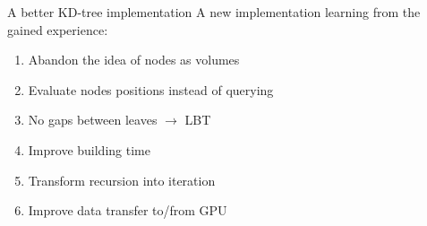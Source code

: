 \documentclass{beamer}
\begin{document}
\begin{frame}{A better KD-tree implementation}
A new implementation learning from the gained experience:
\vspace{5mm}
\begin{enumerate}
\item Abandon the idea of nodes as volumes
\vspace{3mm}
\item Evaluate nodes positions instead of querying
\vspace{3mm}
\item No gaps between leaves $\rightarrow$ LBT
\vspace{3mm}
\item Improve building time
\vspace{3mm}
\item Transform recursion into iteration
\vspace{3mm}
\item Improve data transfer to/from GPU
\end{enumerate}
\end{frame}
\end{document}
